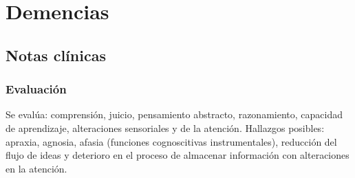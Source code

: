 \chapter{Demencias}
\section*{Notas clínicas}
\subsection*{Evaluación}
Se evalúa: comprensión, juicio, pensamiento abstracto, razonamiento, capacidad de aprendizaje, alteraciones sensoriales y de la atención. Hallazgos posibles: apraxia, agnosia, afasia (funciones cognoscitivas instrumentales), reducción del flujo de ideas y deterioro en el proceso de almacenar información con alteraciones en la atención.
